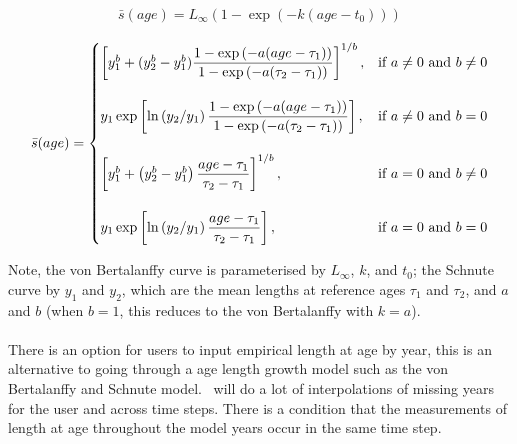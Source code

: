 \paragraph[von Bertalanffy]{}
\begin{equation}
\bar{s}(age)= L_\infty \left( 1 - \exp \left( -k \left(age-t_0 \right) \right) \right)
\end{equation}

\paragraph[Schnute]{}
\begin{equation}
\bar{s}(age)=\displaystyle\begin{cases}
  \left[ y_1^b + (y_2^b - y_1^b) \dfrac{1-\exp \left(-a(age - \tau_1) \right)}{1-\exp \left(-a(\tau_2 - \tau_1) \right)} \right]^{1/b}, & \text{if $a\ne0$ and $b\ne0$} \\
  \AddVspace
  y_1 \exp \left[ \ln \left( y_2 / y_1 \right) \dfrac{1-\exp \left(-a(age - \tau_1) \right)}{1-\exp \left(-a(\tau_2 - \tau_1) \right)} \right], & \text{if $a\ne0$ and $b=0$} \\
  \AddVspace
  \left[ y_1^b + \left( y_2^b - y_1^b \right) \dfrac{age-\tau_1}{\tau_2 - \tau_1} \right]^{1/b}, & \text{if $a=0$ and $b\ne0$} \\
  \AddVspace
  y_1 \exp \left[ \ln \left( y_2/y_1 \right) \dfrac{age-\tau_1}{\tau_2 - \tau_1} \right] , & \text{if $a=0$ and $b=0$} \\
  \end{cases}
\end{equation}

Note, the von Bertalanffy curve is parameterised by $L_\infty$, $k$, and $t_0$; the Schnute curve \citep{836} by $y_1$ and $y_2$, which are the mean lengths at reference ages $\tau_1$ and $\tau_2$, and $a$ and $b$ (when $b=1$, this reduces to the von Bertalanffy with $k=a$).

\paragraph[Data]{}
There is an option for users to input empirical length at age by year, this is an alternative to going through a age length growth model such as the von Bertalanffy and Schnute model. \CNAME\ will do a lot of interpolations of missing years for the user and across time steps. There is a condition that the measurements of length at age throughout the model years occur in the same time step.

